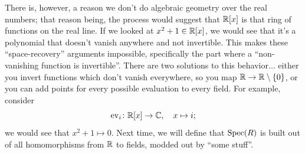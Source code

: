 There is, however, a reason we don't do algebraic geometry over the real numbers; that reason being, the process would suggest that $\mathbb R[x]$ is that ring of functions on the real line. If we looked at $x^2 + 1 \in \mathbb R[x]$, we would see that it's a polynomial that doesn't vanish anywhere and not invertible. This makes these ``space-recovery'' arguments impossible, specifically the part where a ``non-vanishing function is invertible''. There are two solutions to this behavior... either you invert functions which don't vanish everywhere, so you map $\mathbb R \to \mathbb R \setminus \{0\}$, or you can add points for every possible evaluation to every field. For example, consider
\[ \operatorname{ev}_i \colon \mathbb R[x] \to \mathbb C, \quad x \mapsto i; \]
we would see that $x^2 + 1 \mapsto 0$. Next time, we will define that $\operatorname{Spec}(R)$ is built out of all homomorphisms from $\mathbb R$ to fields, modded out by ``some stuff''.